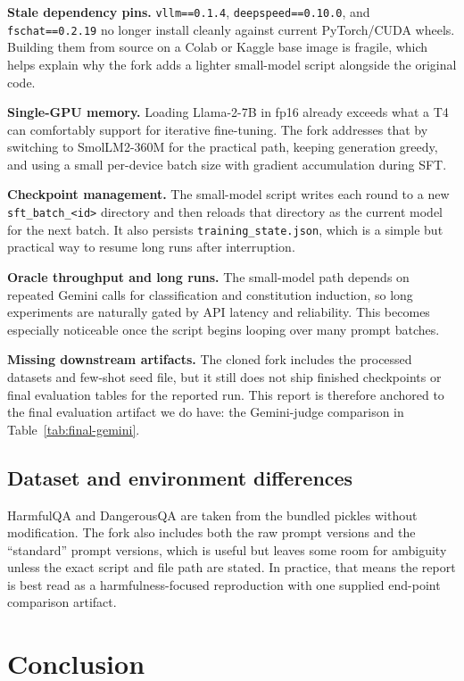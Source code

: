 \documentclass[11pt]{article}
\begin{document}
\textbf{Stale dependency pins.} \texttt{vllm==0.1.4}, \texttt{deepspeed==0.10.0}, and \texttt{fschat==0.2.19} no longer install cleanly against current PyTorch/CUDA wheels. Building them from source on a Colab or Kaggle base image is fragile, which helps explain why the fork adds a lighter small-model script alongside the original code.

\textbf{Single-GPU memory.} Loading Llama-2-7B in fp16 already exceeds what a T4 can comfortably support for iterative fine-tuning. The fork addresses that by switching to SmolLM2-360M for the practical path, keeping generation greedy, and using a small per-device batch size with gradient accumulation during SFT.

\textbf{Checkpoint management.} The small-model script writes each round to a new \texttt{sft\_batch\_<id>} directory and then reloads that directory as the current model for the next batch. It also persists \texttt{training\_state.json}, which is a simple but practical way to resume long runs after interruption.

\textbf{Oracle throughput and long runs.} The small-model path depends on repeated Gemini calls for classification and constitution induction, so long experiments are naturally gated by API latency and reliability. This becomes especially noticeable once the script begins looping over many prompt batches.

\textbf{Missing downstream artifacts.} The cloned fork includes the processed datasets and few-shot seed file, but it still does not ship finished checkpoints or final evaluation tables for the reported run. This report is therefore anchored to the final evaluation artifact we do have: the Gemini-judge comparison in Table~\ref{tab:final-gemini}.

\subsection{Dataset and environment differences}
HarmfulQA and DangerousQA are taken from the bundled pickles without modification. The fork also includes both the raw prompt versions and the ``standard'' prompt versions, which is useful but leaves some room for ambiguity unless the exact script and file path are stated. In practice, that means the report is best read as a harmfulness-focused reproduction with one supplied end-point comparison artifact.

\section{Conclusion}
\label{sec:conclusion}
\end{document}
